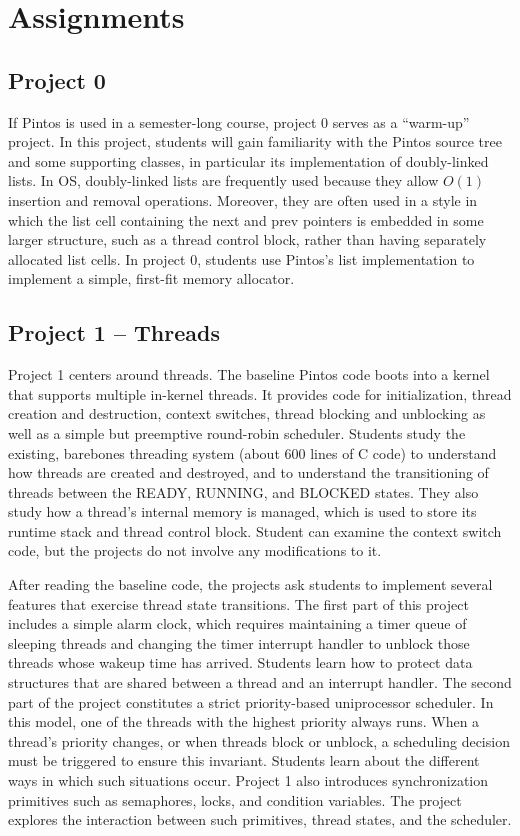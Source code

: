 \section{Assignments}
\label{sec:assignments}

%
%
\subsection{Project 0}
If Pintos is used in a semester-long course, project 0 serves as a ``warm-up'' project.
In this project, students will gain familiarity with the Pintos source tree and some
supporting classes, in particular its implementation of doubly-linked lists.
In OS, doubly-linked lists are frequently used because they allow $O(1)$ insertion and
removal operations.  Moreover, they are often used in a style in which the list cell
containing the next and prev pointers is embedded in some larger structure, such as
a thread control block, rather than having separately allocated list cells.
In project 0, students use Pintos's list implementation to implement a simple, first-fit 
memory allocator.  

\subsection{Project 1 -- Threads}
Project 1 centers around threads.  The baseline Pintos code boots into a kernel that
supports multiple in-kernel threads.  It provides code for initialization, thread creation and
destruction, context switches, thread blocking and unblocking as well as a simple but
preemptive round-robin scheduler.
Students study the existing, barebones threading system (about 600 lines of C code) to 
understand how threads are created and destroyed, and to understand the transitioning of 
threads between the READY, RUNNING, and BLOCKED states.  They also study how a thread's
internal memory is managed, which is used to store its runtime stack and thread control block.
Student can examine the context switch code, but the projects do not involve any modifications
to it.

After reading the baseline code, the projects ask students to implement several features
that exercise thread state transitions.  The first part of this project includes a simple
alarm clock, which requires maintaining a timer queue of sleeping threads and changing 
the timer interrupt handler to unblock those threads whose wakeup time has arrived.
Students learn how to protect data structures that are shared between a thread and an
interrupt handler.  The second part of the project constitutes a strict priority-based
uniprocessor scheduler.  In this model, one of the threads with the highest priority
always runs.  When a thread's priority changes, or when threads block or unblock,  
a scheduling decision must be triggered to ensure this invariant.  Students learn about
the different ways in which such situations occur.  
Project 1 also introduces synchronization primitives such as semaphores, locks,
and condition variables.  The project explores the interaction between such primitives,
thread states, and the scheduler.

